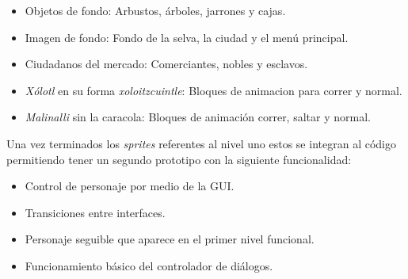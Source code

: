 \begin{itemize}
        \item Objetos de fondo: Arbustos, árboles, jarrones y cajas. 
        \item Imagen de fondo: Fondo de la selva, la ciudad y el menú principal. 
        \item Ciudadanos del mercado: Comerciantes, nobles y esclavos. 
        \item \textit{Xólotl} en su forma \textit{xoloitzcuintle}: Bloques de 
        animacion para correr y normal.
        \item \textit{Malinalli} sin la caracola: Bloques de animación correr, 
        saltar y normal.
\end{itemize}
Una vez terminados los \textit{sprites} referentes al nivel uno estos se integran 
al código permitiendo tener un segundo prototipo con la siguiente funcionalidad:
\begin{itemize}
        \item Control de personaje por medio de la GUI.
        \item Transiciones entre interfaces.
        \item Personaje seguible que aparece en el primer nivel funcional.
        \item Funcionamiento básico del controlador de diálogos.
\end{itemize}

%